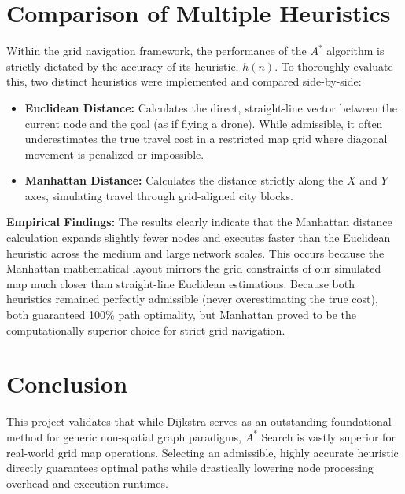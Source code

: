 \documentclass[11pt,a4paper]{article}
\begin{document}
\section{Comparison of Multiple Heuristics}
Within the grid navigation framework, the performance of the $A^*$ algorithm is strictly dictated by the accuracy of its heuristic, $h(n)$. To thoroughly evaluate this, two distinct heuristics were implemented and compared side-by-side:

\begin{itemize}
    \item \textbf{Euclidean Distance:} Calculates the direct, straight-line vector between the current node and the goal (as if flying a drone). While admissible, it often underestimates the true travel cost in a restricted map grid where diagonal movement is penalized or impossible.
    \item \textbf{Manhattan Distance:} Calculates the distance strictly along the $X$ and $Y$ axes, simulating travel through grid-aligned city blocks. 
\end{itemize}

\textbf{Empirical Findings:} The results clearly indicate that the Manhattan distance calculation expands slightly fewer nodes and executes faster than the Euclidean heuristic across the medium and large network scales. This occurs because the Manhattan mathematical layout mirrors the grid constraints of our simulated map much closer than straight-line Euclidean estimations. Because both heuristics remained perfectly admissible (never overestimating the true cost), both guaranteed 100\% path optimality, but Manhattan proved to be the computationally superior choice for strict grid navigation.

\section{Conclusion} 
This project validates that while Dijkstra serves as an outstanding foundational method for generic non-spatial graph paradigms, $A^*$ Search is vastly superior for real-world grid map operations. Selecting an admissible, highly accurate heuristic directly guarantees optimal paths while drastically lowering node processing overhead and execution runtimes.
\end{document}
